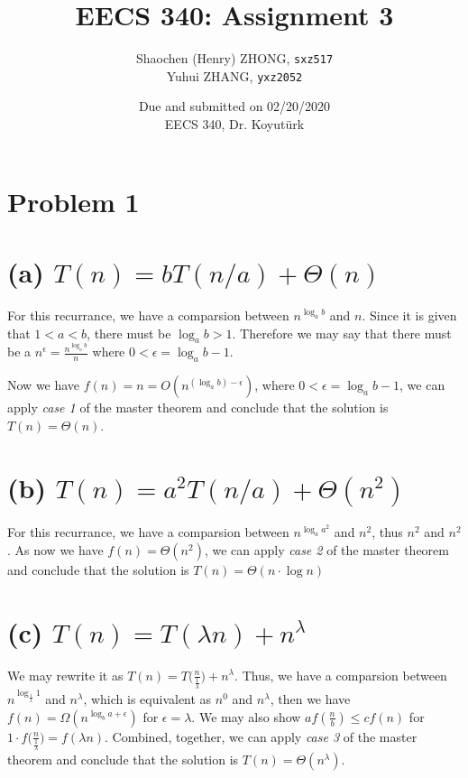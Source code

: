 \documentclass[11pt]{article}
\newcommand{\inlinecode}{\texttt}
\begin{document}
\title{\textbf{EECS 340: Assignment 3}}

\author{Shaochen (Henry) ZHONG, \inlinecode{sxz517} \\ Yuhui ZHANG, \inlinecode{yxz2052}}
\date{Due and submitted on 02/20/2020 \\ EECS 340, Dr. Koyut{\"u}rk}
\maketitle

\section{Problem 1}

\section{(a) $T(n) = bT(n/a) + \Theta(n)$}

For this recurrance, we have a comparsion between $n^{\log_a b}$ and $n$. Since it is given that $1 < a < b$, there must be $\log_a b > 1$. Therefore we may say that there must be a $n^\epsilon = \frac{n^{\log_a b}}{n}$ where $0 < \epsilon = \log_a b - 1$.

Now we have $f(n) = n = O(n^{(\log_a b) - \epsilon})$, where $0 < \epsilon = \log_a b - 1$, we can apply \textit{case 1} of the master theorem and conclude that the solution is $T(n) = \Theta(n)$.

\section{(b) $T(n) = a^2 T(n/a) + \Theta(n^2)$}
For this recurrance, we have a comparsion between $n^{\log_a a^2}$ and $n^2$, thus $n^2$ and $n^2$. As now we have $f(n) = \Theta(n^2)$, we can apply \textit{case 2} of the master theorem and conclude that the solution is $T(n) = \Theta(n \cdot \log n)$


\section{(c) $T(n) = T(\lambda n) + n^{\lambda}$}

We may rewrite it as $T(n) = T\Big(\frac{n}{\frac{1}{\lambda}}\Big) + n^{\lambda}$. Thus, we have a comparsion between $n^{\log_{\frac{1}{\lambda}} 1}$ and $n^{\lambda}$, which is equivalent as $n^0$ and $n^{\lambda}$, then we have $f(n) = \Omega(n^{\log_b a + \epsilon})$ for $\epsilon = \lambda$. We may also show $af(\frac{n}{b}) \leq cf(n)$ for $1 \cdot f\Big(\frac{n}{\frac{1}{\lambda}}\Big) = f(\lambda n)$. Combined, together, we can apply \textit{case 3} of the master theorem and conclude that the solution is $T(n) = \Theta(n^\lambda)$.
\end{document}
